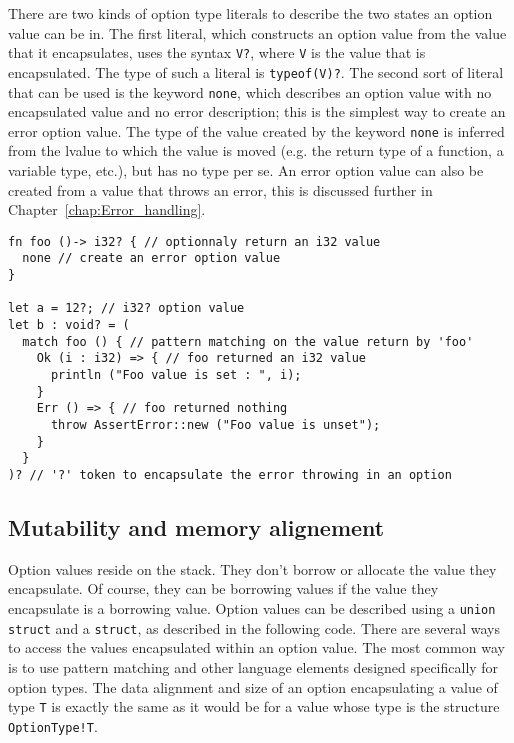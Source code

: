 There are two kinds of option type literals to describe the two states an option
value can be in. The first literal, which constructs an option value from the
value that it encapsulates, uses the syntax \texttt{V?}, where \texttt{V} is the
value that is encapsulated. The type of such a literal is \texttt{typeof(V)?}.
The second sort of literal that can be used is the keyword \texttt{none}, which
describes an option value with no encapsulated value and no error description;
this is the simplest way to create an error option value. The type of the value
created by the keyword \texttt{none} is inferred from the lvalue to which the
value is moved (e.g. the return type of a function, a variable type, etc.), but
has no type per se. An error option value can also be created from a value that
throws an error, this is discussed further in Chapter~\ref{chap:Error_handling}.

\begin{lstlisting}[style=coloredverbatim]
fn foo ()-> i32? { // optionnaly return an i32 value
  none // create an error option value
}

let a = 12?; // i32? option value
let b : void? = (
  match foo () { // pattern matching on the value return by 'foo'
    Ok (i : i32) => { // foo returned an i32 value
      println ("Foo value is set : ", i);
    }
    Err () => { // foo returned nothing
      throw AssertError::new ("Foo value is unset");
    }
  }
)? // '?' token to encapsulate the error throwing in an option

\end{lstlisting}

\subsection{Mutability and memory alignement}

Option values reside on the stack. They don't borrow or allocate the value they
encapsulate. Of course, they can be borrowing values if the value they
encapsulate is a borrowing value. Option values can be described using a
\texttt{union struct} and a \texttt{struct}, as described in the following code.
There are several ways to access the values encapsulated within an option value.
The most common way is to use pattern matching and other language elements
designed specifically for option types. The data alignment and size of an option
encapsulating a value of type \texttt{T} is exactly the same as it would be for
a value whose type is the structure \texttt{OptionType!{T}}.

